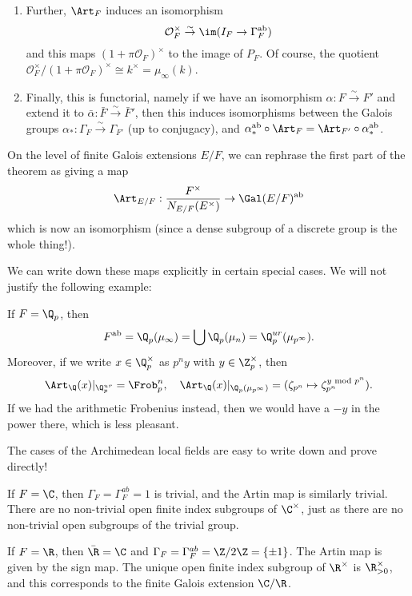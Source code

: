 \documentclass[a4paper]{article}
\newcommand\ab{\mathrm{ab}}
\begin{document}
\begin{thm}
\begin{enumerate}
    \item Further, $\Art_F$ induces an isomorphism
      \[
        \mathcal{O}_F^\times \overset{\sim}{\to} \im(I_F \to \Gamma_F^{\ab})
      \]
      and this maps $(1 + \pi \mathcal{O}_F)^\times$ to the image of $P_F$. Of course, the quotient $\mathcal{O}_F^\times/(1 + \pi \mathcal{O}_F)^\times \cong k^\times = \mu_\infty(k)$.

    \item Finally, this is functorial, namely if we have an isomorphism $\alpha: F \overset{\sim}{\to} F'$ and extend it to $\bar{\alpha} :\bar{F} \overset{\sim}{\to} \bar{F}'$, then this induces isomorphisms between the Galois groups $\alpha_*: \Gamma_F \overset{\sim}{\to} \Gamma_{F'}$ (up to conjugacy), and $\alpha_*^{\ab} \circ \Art_F = \Art_{F'} \circ \alpha_*^{\ab}$.\fakeqed
  \end{enumerate}
\end{thm}

On the level of finite Galois extensions $E/F$, we can rephrase the first part of the theorem as giving a map
\[
  \Art_{E/F}: \frac{F^\times}{N_{E/F}(E^\times)} \to \Gal(E/F)^{\ab}
\]
which is now an isomorphism (since a dense subgroup of a discrete group is the whole thing!).

We can write down these maps explicitly in certain special cases. We will not justify the following example:
\begin{eg}
  If $F = \Q_p$, then
  \[
    F^{\ab} = \Q_p(\mu_\infty) = \bigcup \Q_p(\mu_n) = \Q_p^{ur} (\mu_{p^\infty}).
  \]
  Moreover, if we write $x \in \Q_p^\times$ as $p^n y$ with $y \in \Z_p^\times$, then
  \[
    \Art_\Q(x)|_{\Q_p^{ur}} = \Frob_p^n,\quad \Art_\Q(x) |_{\Q_p(\mu_{p^\infty})} = (\zeta_{p^n} \mapsto \zeta_{p^n}^{y \text{ mod }p^n}).
  \]
  If we had the arithmetic Frobenius instead, then we would have a $-y$ in the power there, which is less pleasant.
\end{eg}

The cases of the Archimedean local fields are easy to write down and prove directly!
\begin{eg}
  If $F = \C$, then $\Gamma_F = \Gamma_F^{ab} = 1$ is trivial, and the Artin map is similarly trivial. There are no non-trivial open finite index subgroups of $\C^\times$, just as there are no non-trivial open subgroups of the trivial group.
\end{eg}

\begin{eg}
  If $F = \R$, then $\bar{\R} = \C$ and $\Gamma_F = \Gamma_F^{ab} = \Z/2\Z = \{\pm 1\}$. The Artin map is given by the sign map. The unique open finite index subgroup of $\R^\times$ is $\R_{>0}^\times$, and this corresponds to the finite Galois extension $\C/\R$.
\end{eg}
\end{document}

